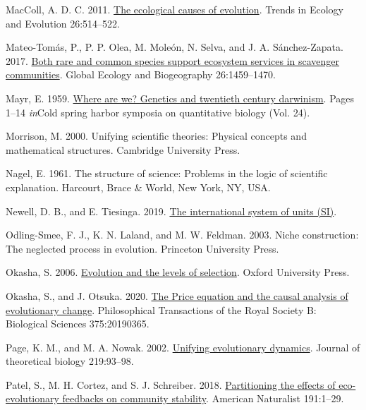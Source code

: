 \documentclass[
]{article}
\newlength{\cslhangindent}
\newenvironment{CSLReferences}[2] %
 {\begin{list}{}{%
  \setlength{\itemindent}{0pt}
  \setlength{\leftmargin}{0pt}
  \setlength{\parsep}{0pt}
  \ifodd #1
   \setlength{\leftmargin}{\cslhangindent}
   \setlength{\itemindent}{-1\cslhangindent}
  \fi
  \setlength{\itemsep}{#2\baselineskip}}}
 {\end{list}}
\begin{document}
\begin{CSLReferences}{1}{0}
MacColl, A. D. C. 2011.
\href{https://doi.org/10.1016/j.tree.2011.06.009}{{The ecological causes
of evolution}}. Trends in Ecology and Evolution 26:514--522.

Mateo-Tomás, P., P. P. Olea, M. Moleón, N. Selva, and J. A.
Sánchez-Zapata. 2017. \href{https://doi.org/10.1111/geb.12673}{{Both
rare and common species support ecosystem services in scavenger
communities}}. Global Ecology and Biogeography 26:1459--1470.

Mayr, E. 1959. \href{https://doi.org/10.1101/SQB.1959.024.01.003}{Where
are we? Genetics and twentieth century darwinism}. Pages 1--14
\emph{in}Cold spring harbor symposia on quantitative biology (Vol. 24).

Morrison, M. 2000. Unifying scientific theories: Physical concepts and
mathematical structures. Cambridge University Press.

Nagel, E. 1961. The structure of science: Problems in the logic of
scientific explanation. Harcourt, Brace \& World, New York, NY, USA.

Newell, D. B., and E. Tiesinga. 2019.
\href{https://doi.org/10.6028/NIST.SP.330-2019}{The international system
of units (SI)}.

Odling-Smee, F. J., K. N. Laland, and M. W. Feldman. 2003. Niche
construction: The neglected process in evolution. Princeton University
Press.

Okasha, S. 2006.
\href{https://doi.org/10.1093/acprof:oso/9780199267972.001.0001}{Evolution
and the levels of selection}. Oxford University Press.

Okasha, S., and J. Otsuka. 2020.
\href{https://doi.org/10.1098/rstb.2019.0365}{{The Price equation and
the causal analysis of evolutionary change}}. Philosophical Transactions
of the Royal Society B: Biological Sciences 375:20190365.

Page, K. M., and M. A. Nowak. 2002.
\href{https://doi.org/10.1006/jtbi.2002.3112}{Unifying evolutionary
dynamics}. Journal of theoretical biology 219:93--98.

Patel, S., M. H. Cortez, and S. J. Schreiber. 2018.
\href{https://doi.org/10.1101/104505}{{Partitioning the effects of
eco-evolutionary feedbacks on community stability}}. American Naturalist
191:1--29.


\end{CSLReferences}
\end{document}

